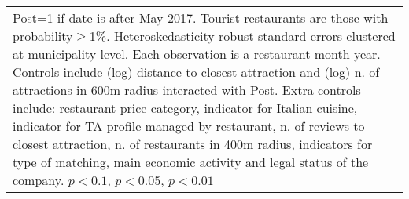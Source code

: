 \begin{table}[H]
\begin{tabularx}{0.9\linewidth}{p{3.7cm} Y Y Y Y}
\hline\hline
\multicolumn{5}{p{0.88\linewidth}}{\tiny Post=1 if date is after May 2017. Tourist restaurants are those with probability$\geq$1\%. Heteroskedasticity-robust standard errors clustered at municipality level. Each observation is a restaurant-month-year. Controls include (log) distance to closest attraction and (log) n. of attractions in 600m radius interacted with Post. Extra controls include: restaurant price category, indicator for Italian cuisine, indicator for TA profile managed by restaurant, n. of reviews to closest attraction, n. of restaurants in 400m radius, indicators for type of matching, main economic activity and legal status of the company. \sym{*} \(p<0.1\), \sym{**} \(p<0.05\), \sym{***} \(p<0.01\)}\\
\end{tabularx}
\end{table}
